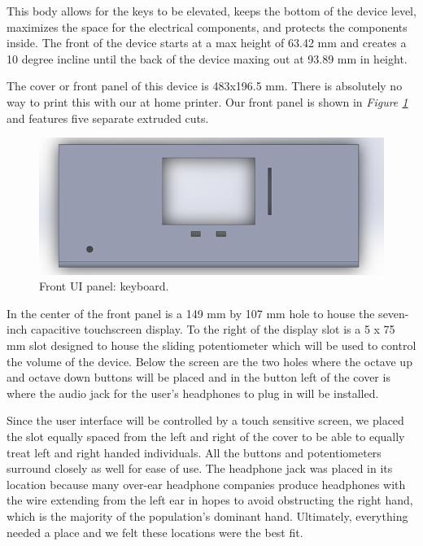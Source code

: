 This body allows for the keys to be elevated, keeps the bottom of the device level, maximizes the space for the electrical components, and protects the components inside. The front of the device starts at a max height of 63.42 mm and creates a 10 degree incline until the back of the device maxing out at 93.89 mm in height.

The cover or front panel of this device is 483x196.5 mm. There is absolutely no way to print this with our at home printer. Our front panel is shown in \textit{Figure \ref{fig:display_model}} and features five separate extruded cuts.

\begin{figure}[h!]
  \centering
  \includegraphics[width=0.9\linewidth]{image/DisplayModel.png}
  \caption{Front UI panel: keyboard.}
  \label{fig:display_model}
\end{figure}

In the center of the front panel is a 149 mm by 107 mm hole to house the seven-inch capacitive touchscreen display. To the right of the display slot is a 5 x 75 mm slot designed to house the sliding potentiometer which will be used to control the volume of the device. Below the screen are the two holes where the octave up and octave down buttons will be placed and in the button left of the cover is where the audio jack for the user’s headphones to plug in will be installed.

Since the user interface will be controlled by a touch sensitive screen, we placed the slot equally spaced from the left and right of the cover to be able to equally treat left and right handed individuals. All the buttons and potentiometers surround closely as well for ease of use. The headphone jack was placed in its location because many over-ear headphone companies produce headphones with the wire extending from the left ear in hopes to avoid obstructing the right hand, which is the majority of the population’s dominant hand. Ultimately, everything needed a place and we felt these locations were the best fit.

